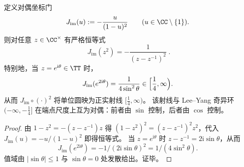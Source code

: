 \begin{proposition}\label{prop:leyang-dual-imag-gate}
定义对偶坐标门
\[
J_{\mathrm{im}}(u):=-\frac{u}{(1-u)^2}\qquad(u\in\CC\setminus\{1\}).
\]
则对任意 \(z\in\CC^{\times}\) 有严格恒等式
\[
\boxed{\;
J_{\mathrm{im}}(z^2)=-\frac{1}{(z-z^{-1})^2}\; }.
\]
特别地，当 \(z=e^{\mathrm{i}\theta}\in\TT\) 时，
\[
J_{\mathrm{im}}(e^{2\mathrm{i}\theta})=\frac{1}{4\sin^2\theta}\in\Bigl[\frac14,\infty\Bigr).
\]
从而 \(J_{\mathrm{im}}\circ(\cdot)^2\) 将单位圆映为正实射线 \([\tfrac14,\infty)\)。
该射线与 Lee--Yang 奇异环 \((-\infty,-\tfrac14]\) 在端点尺度上互为对偶：前者由 \(\sin\) 控制，后者由 \(\cos\) 控制。
\end{proposition}
\begin{proof}
由 \(1-z^2=-(z-z^{-1})z\) 得 \((1-z^2)^2=(z-z^{-1})^2 z^2\)，代入 \(J_{\mathrm{im}}(u)=-u/(1-u)^2\) 即得恒等式。
当 \(z=e^{\mathrm{i}\theta}\) 时 \(z-z^{-1}=2\mathrm{i}\sin\theta\)，从而
\[
J_{\mathrm{im}}(e^{2\mathrm{i}\theta})=-1/(2\mathrm{i}\sin\theta)^2=1/(4\sin^2\theta).
\]
值域由 \(|\sin\theta|\le 1\) 与 \(\sin\theta=0\) 处发散给出。证毕。
\end{proof}

\endinput
